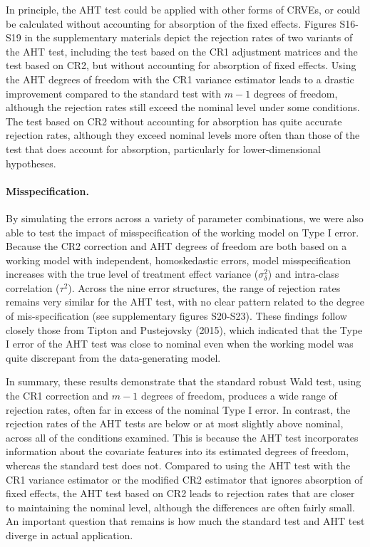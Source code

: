 \documentclass[12pt]{article}
\begin{document}
In principle, the AHT test could be applied with other forms of CRVEs,
or could be calculated without accounting for absorption of the fixed
effects. Figures S16-S19 in the supplementary materials depict the
rejection rates of two variants of the AHT test, including the test
based on the CR1 adjustment matrices and the test based on CR2, but
without accounting for absorption of fixed effects. Using the AHT
degrees of freedom with the CR1 variance estimator leads to a drastic
improvement compared to the standard test with \(m - 1\) degrees of
freedom, although the rejection rates still exceed the nominal level
under some conditions. The test based on CR2 without accounting for
absorption has quite accurate rejection rates, although they exceed
nominal levels more often than those of the test that does account for
absorption, particularly for lower-dimensional hypotheses.

\hypertarget{misspecification.}{%
\paragraph{Misspecification.}\label{misspecification.}}

By simulating the errors across a variety of parameter combinations, we
were also able to test the impact of misspecification of the working
model on Type I error. Because the CR2 correction and AHT degrees of
freedom are both based on a working model with independent,
homoskedastic errors, model misspecification increases with the true
level of treatment effect variance (\(\sigma_\delta^2\)) and intra-class
correlation (\(\tau^2\)). Across the nine error structures, the range of
rejection rates remains very similar for the AHT test, with no clear
pattern related to the degree of mis-specification (see supplementary
figures S20-S23). These findings follow closely those from Tipton and
Pustejovsky (2015), which indicated that the Type I error of the AHT
test was close to nominal even when the working model was quite
discrepant from the data-generating model.

In summary, these results demonstrate that the standard robust Wald
test, using the CR1 correction and \(m - 1\) degrees of freedom,
produces a wide range of rejection rates, often far in excess of the
nominal Type I error. In contrast, the rejection rates of the AHT tests
are below or at most slightly above nominal, across all of the
conditions examined. This is because the AHT test incorporates
information about the covariate features into its estimated degrees of
freedom, whereas the standard test does not. Compared to using the AHT
test with the CR1 variance estimator or the modified CR2 estimator that
ignores absorption of fixed effects, the AHT test based on CR2 leads to
rejection rates that are closer to maintaining the nominal level,
although the differences are often fairly small. An important question
that remains is how much the standard test and AHT test diverge in
actual application.
\end{document}
